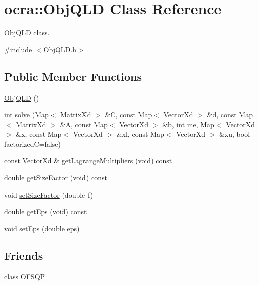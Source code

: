 \hypertarget{classocra_1_1ObjQLD}{}\section{ocra\+:\+:Obj\+Q\+LD Class Reference}
\label{classocra_1_1ObjQLD}


Obj\+Q\+LD class.  




{\ttfamily \#include $<$Obj\+Q\+L\+D.\+h$>$}

\subsection*{Public Member Functions}
\begin{DoxyCompactItemize}
\item 
\hyperlink{classocra_1_1ObjQLD_a947a8380d40c94bdcec2f228df03eac1}{Obj\+Q\+LD} ()
\item 
int \hyperlink{classocra_1_1ObjQLD_a9d2b34b957b7c3868aefde7ef7017573}{solve} (Map$<$ Matrix\+Xd $>$ \&C, const Map$<$ Vector\+Xd $>$ \&d, const Map$<$ Matrix\+Xd $>$ \&A, const Map$<$ Vector\+Xd $>$ \&b, int me, Map$<$ Vector\+Xd $>$ \&x, const Map$<$ Vector\+Xd $>$ \&xl, const Map$<$ Vector\+Xd $>$ \&xu, bool factorizedC=false)
\item 
const Vector\+Xd \& \hyperlink{classocra_1_1ObjQLD_a254ecf802e84e50ef2a380b21ef046f8}{get\+Lagrange\+Multipliers} (void) const 
\item 
double \hyperlink{classocra_1_1ObjQLD_acc7f73f559f548ca9c78ad7e8aabc65b}{get\+Size\+Factor} (void) const 
\item 
void \hyperlink{classocra_1_1ObjQLD_a79e0e04d6db99b053174e9298aa2c45d}{set\+Size\+Factor} (double f)
\item 
double \hyperlink{classocra_1_1ObjQLD_a9dc395adefc401061d8184edbedf212c}{get\+Eps} (void) const 
\item 
void \hyperlink{classocra_1_1ObjQLD_a6fb05dae8b643ba2dd9e03aac8cde624}{set\+Eps} (double eps)
\end{DoxyCompactItemize}
\subsection*{Friends}
\begin{DoxyCompactItemize}
\item 
class \hyperlink{classocra_1_1ObjQLD_a35ebfe61821cfb93672b26cc472c939e}{O\+F\+S\+QP}
\end{DoxyCompactItemize}


